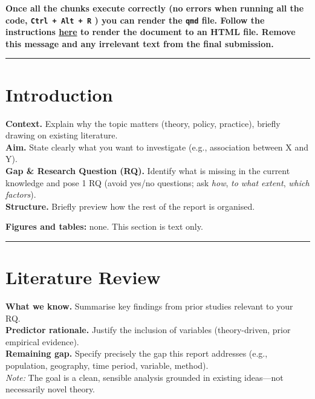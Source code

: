 \documentclass[
  letterpaper,
  DIV=11,
  numbers=noendperiod]{scrreprt}
\newcounter{none} %
\begin{document}
\textbf{Once all the chunks execute correctly (no errors when running
all the code, \texttt{Ctrl\ +\ Alt\ +\ R} ) you can render the
\texttt{qmd} file. Follow the instructions
\href{https://gdsl-ul.github.io/stats/general/howSubmit.html}{here} to
render the document to an HTML file. Remove this message and any
irrelevant text from the final submission.}

\begin{center}\rule{0.5\linewidth}{0.5pt}\end{center}

\section*{Introduction}\label{introduction}


\textbf{Context.} Explain why the topic matters (theory, policy,
practice), briefly drawing on existing literature.\\
\textbf{Aim.} State clearly what you want to investigate (e.g.,
association between X and Y).\\
\textbf{Gap \& Research Question (RQ).} Identify what is missing in the
current knowledge and pose 1 RQ (avoid yes/no questions; ask \emph{how},
\emph{to what extent}, \emph{which factors}).\\
\textbf{Structure.} Briefly preview how the rest of the report is
organised.

\textbf{Figures and tables:} none. This section is text only.

\begin{center}\rule{0.5\linewidth}{0.5pt}\end{center}

\section*{Literature Review}\label{literature-review}


\textbf{What we know.} Summarise key findings from prior studies
relevant to your RQ.\\
\textbf{Predictor rationale.} Justify the inclusion of variables
(theory-driven, prior empirical evidence).\\
\textbf{Remaining gap.} Specify precisely the gap this report addresses
(e.g., population, geography, time period, variable, method).\\
\emph{Note:} The goal is a clean, sensible analysis grounded in existing
ideas---not necessarily novel theory.
\end{document}
